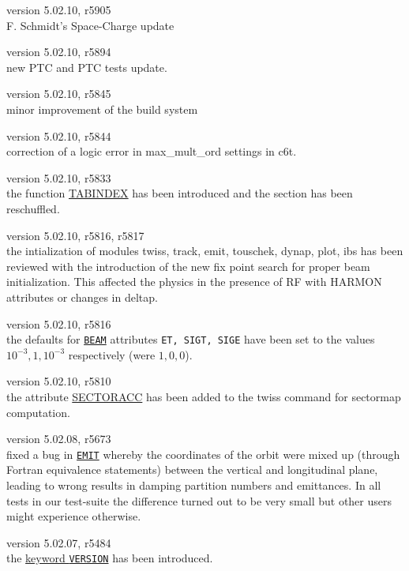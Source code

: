 \begin{madlist}
   version 5.02.10, r5905 \\
    F. Schmidt's Space-Charge update 

   version 5.02.10, r5894 \\
    new PTC and PTC tests update.
 
   version 5.02.10, r5845 \\
    minor improvement of the build system
  
   version 5.02.10, r5844  \\
    correction of a logic error in max\_mult\_ord settings in c6t. 

   version 5.02.10, r5833\\
  the function \hyperref[subsubsec:table]{TABINDEX} has been introduced and the section has been reschuffled.

   version 5.02.10, r5816, r5817\\
  the intialization of modules twiss, track, emit, touschek, dynap, plot, ibs has been reviewed with the introduction of the new fix point search for proper beam initialization. This affected the physics in the presence of RF with HARMON attributes or changes in deltap.

   version 5.02.10, r5816\\
  the defaults for \hyperref[sec:beam]{\texttt{BEAM}} attributes \texttt{ET, SIGT, SIGE} have been set to the values $10^{-3}, 1, 10^{-3}$ respectively (were $1, 0, 0$).

   version 5.02.10, r5810\\
  the attribute \hyperref[chap:twiss]{SECTORACC} has been added to the twiss command for sectormap computation.

   version 5.02.08, r5673\\
  fixed a bug in \hyperref[chap:emit]{\texttt{EMIT}} whereby the
  coordinates of the orbit were mixed up (through Fortran equivalence
  statements) between the vertical and longitudinal plane, leading to
  wrong results in damping partition numbers and emittances. In all tests
  in our test-suite the difference turned out to be very small but other
  users might experience otherwise.

   version 5.02.07, r5484\\
  the \hyperref[subsec:keyword]{keyword \texttt{VERSION}} has been introduced.
  

\end{madlist}
